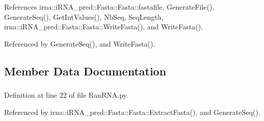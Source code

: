 \-References irna\-::i\-R\-N\-A\-\_\-pred\-::\-Fasta\-::\-Fasta\-::fastafile, \-Generate\-File(), \-Generate\-Seq(), \-Get\-Int\-Values(), \-Nb\-Seq, \-Seq\-Length, irna\-::i\-R\-N\-A\-\_\-pred\-::\-Fasta\-::\-Fasta\-::\-Write\-Fasta(), and \-Write\-Fasta().



\-Referenced by \-Generate\-Seq(), and \-Write\-Fasta().



\subsection{\-Member \-Data \-Documentation}
\hypertarget{classirna_1_1iRNA__pred_1_1RanRNA_1_1RanRNA_a13327d7ea4c8cd006c2079255a029f4b}{
\subsubsection[{\-G\-C}]{}}
\label{classirna_1_1iRNA__pred_1_1RanRNA_1_1RanRNA_a13327d7ea4c8cd006c2079255a029f4b}


\-Definition at line 22 of file \-Ran\-R\-N\-A.\-py.



\-Referenced by irna\-::i\-R\-N\-A\-\_\-pred\-::\-Fasta\-::\-Fasta\-::\-Extract\-Fasta(), and \-Generate\-Seq().

\hypertarget{classirna_1_1iRNA__pred_1_1RanRNA_1_1RanRNA_aaed8395a2ce27e8661edf3dbc3c6110c}{
\subsubsection[{\-Nb\-Seq}]{}}
\label{classirna_1_1iRNA__pred_1_1RanRNA_1_1RanRNA_aaed8395a2ce27e8661edf3dbc3c6110c}



